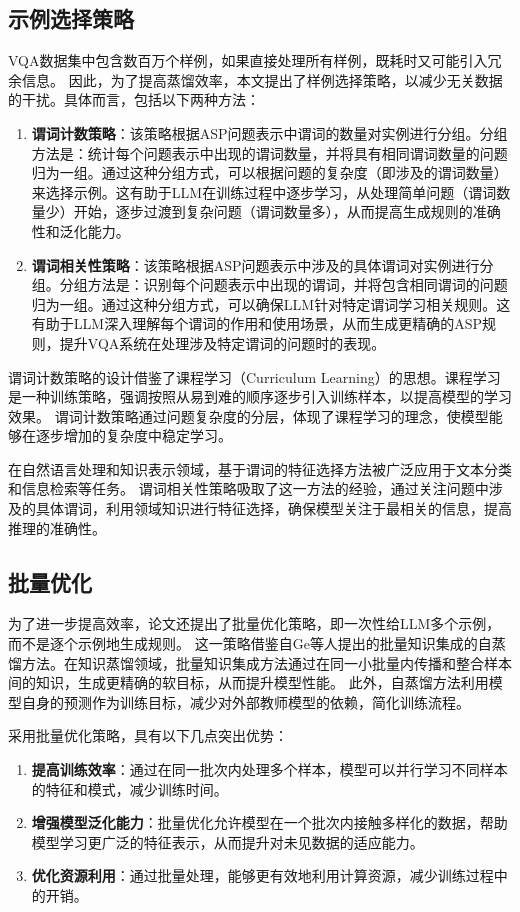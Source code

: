 \subsection{示例选择策略}
VQA数据集中包含数百万个样例，如果直接处理所有样例，既耗时又可能引入冗余信息。
因此，为了提高蒸馏效率，本文提出了样例选择策略，以减少无关数据的干扰。具体而言，包括以下两种方法：
\begin{enumerate}[itemsep=0pt,parsep=0pt]
\item \textbf{谓词计数策略}：该策略根据ASP问题表示中谓词的数量对实例进行分组。​分组方法是：​统计每个问题表示中出现的谓词数量，并将具有相同谓词数量的问题归为一组。​​通过这种分组方式，可以根据问题的复杂度（即涉及的谓词数量）来选择示例。
​这有助于LLM在训练过程中逐步学习，从处理简单问题（谓词数量少）开始，逐步过渡到复杂问题（谓词数量多），从而提高生成规则的准确性和泛化能力。
\item \textbf{谓词相关性策略}：该策略根据ASP问题表示中涉及的具体谓词对实例进行分组。分组方法是：​识别每个问题表示中出现的谓词，并将包含相同谓词的问题归为一组。​
通过这种分组方式，可以确保LLM针对特定谓词学习相关规则。​这有助于LLM深入理解每个谓词的作用和使用场景，从而生成更精确的ASP规则，提升VQA系统在处理涉及特定谓词的问题时的表现。
\end{enumerate}

谓词计数策略的设计借鉴了课程学习（Curriculum Learning）的思想。
​课程学习是一种训练策略，强调按照从易到难的顺序逐步引入训练样本，以提高模型的学习效果。
谓词计数策略通过问题复杂度的分层，体现了课程学习的理念，使模型能够在逐步增加的复杂度中稳定学习。

​在自然语言处理和知识表示领域，基于谓词的特征选择方法被广泛应用于文本分类和信息检索等任务。
谓词相关性策略吸取了这一方法的经验，通过关注问题中涉及的具体谓词，利用领域知识进行特征选择，确保模型关注于最相关的信息，提高推理的准确性。
\subsection{批量优化}
为了进一步提高效率，论文还提出了批量优化策略，即一次性给LLM多个示例，而不是逐个示例地生成规则。
这一策略借鉴自Ge\cite{ge2021selfdistillationbatchknowledgeensembling}等人提出的批量知识集成的自蒸馏方法。
​在知识蒸馏领域，批量知识集成方法通过在同一小批量内传播和整合样本间的知识，生成更精确的软目标，从而提升模型性能。
此外，自蒸馏方法利用模型自身的预测作为训练目标，减少对外部教师模型的依赖，简化训练流程。

采用批量优化策略，具有以下几点突出优势：
\begin{enumerate}[itemsep=0pt,parsep=0pt]
\item \textbf{提高训练效率}：​通过在同一批次内处理多个样本，模型可以并行学习不同样本的特征和模式，减少训练时间。
\item \textbf{增强模型泛化能力}：批量优化允许模型在一个批次内接触多样化的数据，帮助模型学习更广泛的特征表示，从而提升对未见数据的适应能力。
\item \textbf{优化资源利用}：通过批量处理，能够更有效地利用计算资源，减少训练过程中的开销。
\end{enumerate}

